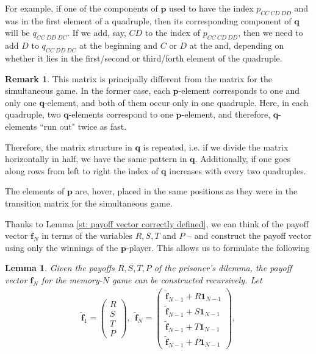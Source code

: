 \documentclass{article}
\def\p{\mathbf{p}}
\def\q{\mathbf{q}}
\newtheorem{lemma}[theorem]{Lemma}
\theoremstyle{definition}
\newtheorem{remark}[theorem]{Remark}
\numberwithin{equation}{section}
\begin{document}
For example, if  one of the components of $\p$ used to have the index $p_{CC\   CD \  DD}$ and was in the first element of a quadruple, then its corresponding component of $\q$ will be $q_{CC\ DD\ DC}$. If we add, say, $CD$ to the index of $p_{CC\   CD \  DD}$, then we need to add $D$ to $q_{CC\ DD\ DC}$ at the beginning and $C$ or $D$ at the and, depending on whether it lies in the first/second or third/forth element of the quadruple. 


\begin{remark}
This matrix is principally different from the matrix for the simultaneous game. In the former case, each $\p$-element corresponds to one and only one $\q$-element, and both of them occur only in one quadruple. Here, in each quadruple, two $\q$-elements correspond to one $\p$-element, and therefore, $\q$-elements ``run out" twice as fast. 

Therefore, the matrix structure in $\q$ is repeated, i.e. if we divide the matrix horizontally in half, we have the same pattern in $\q$. Additionally, if one goes along rows from left to right the index of $\q$ increases with every two quadruples.

The elements of $\p$ are, hover, placed in the same positions as they were in the transition matrix for the simultaneous game. 

Thanks to Lemma \ref{st: payoff vector correctly defined}, we can think of the payoff vector $\mathbf{f}_N$  in terms of the variables $R,S,T$ and $P$ -- and construct the payoff vector using only the winnings of the $\p$-player. This allows us to formulate the following 
\begin{lemma}
\label{st: recursive payoff vector}
Given the payoffs $R,S,T,P$ of the prisoner's dilemma, the payoff vector $\mathbf{f}_N$ for the memory-$N$ game can be constructed recursively. Let 
    \begin{equation}
    \label{eq: recursive noq quite payoff}
    \begin{split}
       \widetilde{ \mathbf{f}}_1  = \begin{pmatrix} R\\S\\T\\P \end{pmatrix}, \ \ \widetilde{\mathbf{f}}_{N} = \begin{pmatrix} \widetilde{\mathbf{f}}_{N-1}+R\mathbf{1}_{N-1}\\\widetilde{\mathbf{f}}_{N-1}+S\mathbf{1}_{N-1}\\\widetilde{\mathbf{f}}_{N-1}+T\mathbf{1}_{N-1}\\\widetilde{\mathbf{f}}_{N-1}+P\mathbf{1}_{N-1}\end{pmatrix}, 
        \end{split}
    \end{equation}
    

\end{lemma}
\end{remark}
\end{document}
